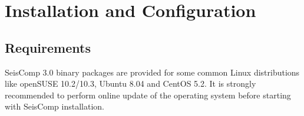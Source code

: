 \documentclass[11pt,a4paper,titlepage]{article}
\newcommand{\seiscomp}{SeisComp }
\begin{document}
%

\newpage


\section{Installation and Configuration}

\subsection{Requirements}

\seiscomp 3.0 binary packages are provided for some common Linux
distributions like openSUSE 10.2/10.3, Ubuntu 8.04 and CentOS 5.2. It is
strongly recommended to perform online update of the operating system
before starting with \seiscomp installation.
\end{document}
